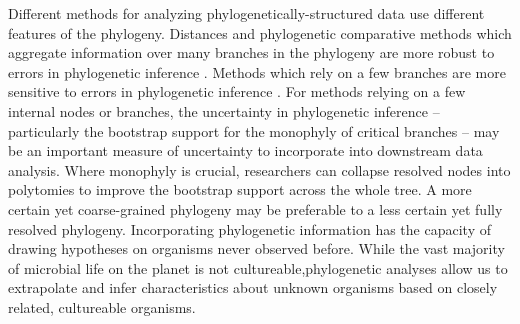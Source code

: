 Different methods for analyzing phylogenetically-structured data use different features of the phylogeny. Distances and phylogenetic comparative methods which aggregate information over many branches in the phylogeny are more robust to errors in phylogenetic inference\cite{weighted_unifrac,robust_phylogenetic_regression} . Methods which rely on a few branches are more sensitive to errors in phylogenetic inference \cite{riesenfel_phylogeny}. For methods relying on a few internal nodes or branches, the uncertainty in phylogenetic inference – particularly the bootstrap support for the monophyly of critical branches\cite{felsenstein_confidence} – may be an important measure of uncertainty to incorporate into downstream data analysis. Where monophyly is crucial, researchers can collapse resolved nodes into polytomies to improve the bootstrap support across the whole tree. A more certain yet coarse-grained phylogeny may be preferable to a less certain yet fully resolved phylogeny.  Incorporating phylogenetic information has the capacity of drawing hypotheses on organisms never observed before.  While the vast majority of microbial life on the planet is not cultureable,phylogenetic analyses allow us to extrapolate and infer characteristics about unknown organisms based on closely related, cultureable organisms.
